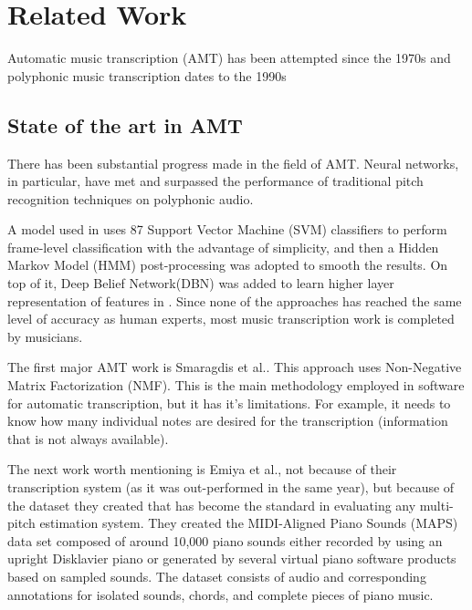 \newpage
\section{Related Work}

Automatic music transcription (AMT) has been attempted since the 1970s and polyphonic music transcription dates to the 1990s \cite{REF:1}
\par

\subsection{State of the art in AMT}

There has been substantial progress made in the field of AMT. Neural networks, in particular, have met and surpassed the performance of traditional pitch recognition techniques on polyphonic audio.
\par

A model used in \cite{REF:2} uses 87 Support Vector Machine (SVM) classifiers to perform frame-level classification with the advantage of simplicity, and then a Hidden Markov Model (HMM) post-processing was adopted to smooth the results. On top of it, Deep Belief Network(DBN) was added to learn higher layer representation of features in \cite{REF:3}. Since none of the approaches has reached the same level of accuracy as human experts, most music transcription work is completed by musicians.
\par

The first major AMT work is Smaragdis et al.\cite{REF:8}. This approach uses Non-Negative Matrix Factorization (NMF). This is the main methodology employed in software for automatic transcription, but it has it's limitations. For example, it needs to know how many individual notes are desired for the transcription (information that is not always available).
\par

The next work worth mentioning is Emiya et al.\cite{REF:9}, not because of their transcription system (as it was out-performed in the same year), but because of the dataset they created that has become the standard in evaluating any multi-pitch estimation system. They created the MIDI-Aligned Piano Sounds (MAPS) data set composed of around 10,000 piano sounds either recorded by using an upright Disklavier piano or generated by several virtual piano software products based on sampled sounds. The dataset
consists of audio and corresponding annotations for isolated sounds, chords, and complete pieces of piano music.
\par

